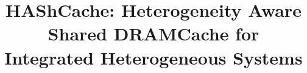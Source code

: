 \documentclass{sig-alternate}
\newcommand{\cachename}{HAShCache}
\begin{document}
\title{\cachename: Heterogeneity Aware Shared DRAMCache for Integrated Heterogeneous Systems}

\maketitle
\thispagestyle{firstpage}
\pagestyle{plain}






















\end{document}
